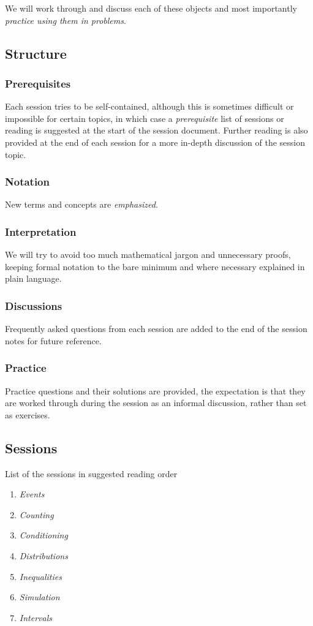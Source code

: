 We will work through and discuss each of these objects 
and most importantly \emph{practice using them in problems}. 

\subsection{Structure}

\subsubsection{Prerequisites}

Each session tries to be self-contained, 
although this is sometimes difficult or impossible for certain topics, 
in which case a \emph{prerequisite} list of sessions or reading is suggested at the start of the session document. 
Further reading is also provided at the end of each session for a more in-depth discussion 
of the session topic.

\subsubsection{Notation}

New terms and concepts are \emph{emphasized}. 

\subsubsection{Interpretation}

We will try to avoid too much mathematical jargon and unnecessary proofs, 
keeping formal notation to the bare minimum and where necessary 
explained in plain language.

\subsubsection{Discussions}

Frequently asked questions from each session 
are added to the end of the session notes for future reference.

\subsubsection{Practice}

Practice questions and their solutions are provided, 
the expectation is that they are worked through during the session as an informal discussion, 
rather than set as exercises.

\subsection{Sessions}

List of the sessions in suggested reading order

\begin{enumerate}
\def\labelenumi{\arabic{enumi}.}
\item \emph{Events}
\item \emph{Counting}
\item \emph{Conditioning}
\item \emph{Distributions}
\item \emph{Inequalities}
\item \emph{Simulation}
\item \emph{Intervals}
\end{enumerate}



